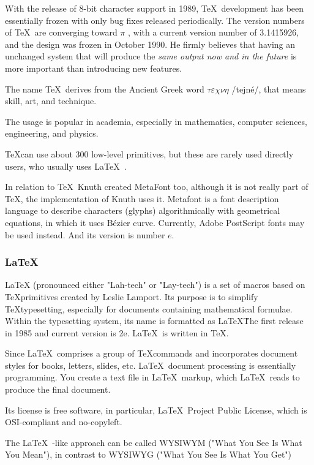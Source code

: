 \documentclass[11pt]{article}
\begin{document}
With the release of 8-bit character support in 1989, \TeX\ development has been essentially frozen with only bug fixes released periodically. The version numbers of \TeX\ are converging toward $\pi$ , with a current version number of 3.1415926, and the design was frozen in October 1990. He firmly believes that having an unchanged system that will produce the\emph{ same output now and in the future} is more important than introducing new features.

The name \TeX\  derives from the Ancient Greek word $\tau\varepsilon\chi\nu\eta$ /tejné/, that means skill, art, and technique. 


The usage is popular in academia, especially in mathematics, computer sciences, engineering, and physics.

\TeX can use about 300 low-level primitives, but these are rarely used directly users, who usually uses \LaTeX\ . 

In relation to \TeX\ Knuth created MetaFont too, although it is not really part of \TeX , the implementation of Knuth uses it. Metafont is a font description language to describe characters (glyphs) algorithmically with geometrical equations, in which it uses Bézier curve. Currently, Adobe PostScript fonts may be used instead. And its version is number $e$.
 
\subsubsection{\LaTeX\ }
LaTeX (pronounced either "Lah-tech" or "Lay-tech") is a set of macros based on \TeX primitives created by Leslie Lamport. Its purpose is to simplify \TeX typesetting, especially for documents containing mathematical formulae. Within the typesetting system, its name is formatted as \LaTeX\. The first release in 1985 and current version is 2e. \LaTeX\ is written in  \TeX.

Since \LaTeX\  comprises a group of \TeX commands and incorporates document styles for books, letters, slides, etc. \LaTeX\  document processing is essentially programming. You create a text file in \LaTeX\  markup, which \LaTeX\ reads to produce the final document.

Its license is free software, in particular, \LaTeX\ Project Public License, which is OSI-compliant and no-copyleft. 

The \LaTeX\ -like approach can be called WYSIWYM ("What You See Is What You Mean"), in contrast to WYSIWYG ("What You See Is What You Get")
\end{document}
